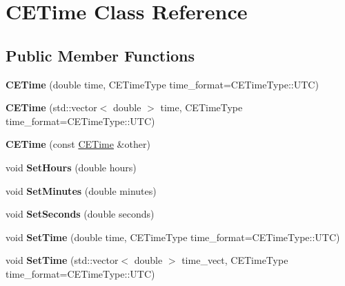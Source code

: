 \hypertarget{class_c_e_time}{}\section{C\+E\+Time Class Reference}
\label{class_c_e_time}
\subsection*{Public Member Functions}
\begin{DoxyCompactItemize}
\item 
\hypertarget{class_c_e_time_a51fd336dc8cf6d47458a8c71c8ff5a6c}{}{\bfseries C\+E\+Time} (double time, C\+E\+Time\+Type time\+\_\+format=C\+E\+Time\+Type\+::\+U\+T\+C)\label{class_c_e_time_a51fd336dc8cf6d47458a8c71c8ff5a6c}

\item 
\hypertarget{class_c_e_time_aaf619d89df31f4299e772ab5a4048f01}{}{\bfseries C\+E\+Time} (std\+::vector$<$ double $>$ time, C\+E\+Time\+Type time\+\_\+format=C\+E\+Time\+Type\+::\+U\+T\+C)\label{class_c_e_time_aaf619d89df31f4299e772ab5a4048f01}

\item 
\hypertarget{class_c_e_time_a4236696681a47639ba8d1bc62a871019}{}{\bfseries C\+E\+Time} (const \hyperlink{class_c_e_time}{C\+E\+Time} \&other)\label{class_c_e_time_a4236696681a47639ba8d1bc62a871019}

\item 
\hypertarget{class_c_e_time_a678aab3e4a23617cea90252266ab2f04}{}void {\bfseries Set\+Hours} (double hours)\label{class_c_e_time_a678aab3e4a23617cea90252266ab2f04}

\item 
\hypertarget{class_c_e_time_abbc4ddb4d831e79082e0a0cd6631f717}{}void {\bfseries Set\+Minutes} (double minutes)\label{class_c_e_time_abbc4ddb4d831e79082e0a0cd6631f717}

\item 
\hypertarget{class_c_e_time_a2b310f23e9beb7ecb7e9085d9577dd4f}{}void {\bfseries Set\+Seconds} (double seconds)\label{class_c_e_time_a2b310f23e9beb7ecb7e9085d9577dd4f}

\item 
\hypertarget{class_c_e_time_abfc3a19db6d6dd2ce286edcec6e6c7d0}{}void {\bfseries Set\+Time} (double time, C\+E\+Time\+Type time\+\_\+format=C\+E\+Time\+Type\+::\+U\+T\+C)\label{class_c_e_time_abfc3a19db6d6dd2ce286edcec6e6c7d0}

\item 
\hypertarget{class_c_e_time_a89a3f0684abbc324d84282fa983c284e}{}void {\bfseries Set\+Time} (std\+::vector$<$ double $>$ time\+\_\+vect, C\+E\+Time\+Type time\+\_\+format=C\+E\+Time\+Type\+::\+U\+T\+C)\label{class_c_e_time_a89a3f0684abbc324d84282fa983c284e}

\end{DoxyCompactItemize}
